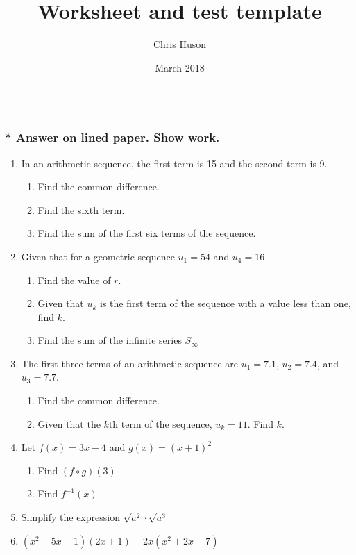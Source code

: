 \documentclass[12pt, oneside]{article}
\title{Worksheet and test template}
\author{Chris Huson}
\date{March 2018}
\begin{document}
\subsubsection*{\\* Answer on lined paper. Show work.}

\begin{enumerate}

\item In an arithmetic sequence, the first term is 15 and the second term is 9.
\begin{enumerate}
    \item Find the common difference.
    \item Find the sixth term.
    \item Find the sum of the first six terms of the sequence.
\end{enumerate}

\item Given that for a geometric sequence $u_1=54$ and $u_4=16$
\begin{enumerate}
    \item Find the value of $r$.
    \item Given that $u_k$ is the first term of the sequence with a value less than one, find $k$.
    \item Find the sum of the infinite series $S_\infty$
\end{enumerate}

\item The first three terms of an arithmetic sequence are $u_1=7.1$, $u_2=7.4$, and $u_3=7.7$.
\begin{enumerate}
    \item Find the common difference.
    \item Given that the $k$th term of the sequence, $u_k=11$. Find $k$.
\end{enumerate}


\item Let $f(x) = 3x -4$ and $g(x)=(x+1)^2$
\begin{enumerate}
    \item Find $(f \circ g)(3)$
    \item Find $f^{-1}(x)$
\end{enumerate}


\item Simplify the expression $\sqrt{a^2} \cdot \sqrt{a^3}$

\item $(x^2-5x-1)(2x+1)-2x(x^2+2x-7)$


\end{enumerate}
\end{document}
